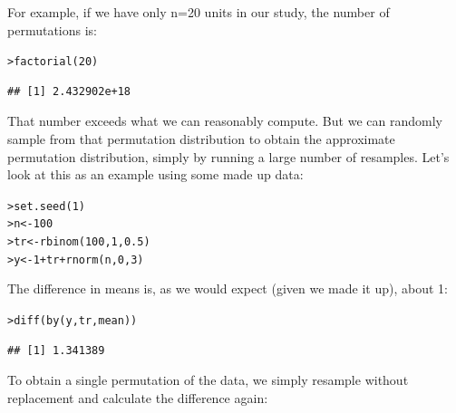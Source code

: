 \documentclass[12pt]{article}\usepackage[]{graphicx}\usepackage[]{color}
\makeatletter
\newcommand{\hlnum}[1]{\textcolor[rgb]{0.82,0.78,0.62}{#1}}%
\newcommand{\hlopt}[1]{\textcolor[rgb]{0.882,0.878,0.898}{#1}}%
\newcommand{\hlstd}[1]{\textcolor[rgb]{0.882,0.878,0.898}{#1}}%
\newcommand{\hlkwb}[1]{\textcolor[rgb]{0.902,0.675,0.196}{#1}}%
\newcommand{\hlkwd}[1]{\textcolor[rgb]{0.733,0.388,0.812}{#1}}%
\newenvironment{kframe}{%
 \def\at@end@of@kframe{}%
 \ifinner\ifhmode%
  \def\at@end@of@kframe{\end{minipage}}%
  \begin{minipage}{\columnwidth}%
 \fi\fi%
 \def\FrameCommand##1{\hskip\@totalleftmargin \hskip-\fboxsep
 \colorbox{shadecolor}{##1}\hskip-\fboxsep
     \hskip-\linewidth \hskip-\@totalleftmargin \hskip\columnwidth}%
 \MakeFramed {\advance\hsize-\width
   \@totalleftmargin\z@ \linewidth\hsize
   \@setminipage}}%
 {\par\unskip\endMakeFramed%
 \at@end@of@kframe}
\newenvironment{knitrout}{}{} %
\makeatother
\begin{document}
\begin{flushleft}
For example, if we have only n=20 units in our study, the number of permutations is:

\begin{knitrout}
\color{fgcolor}\begin{kframe}
\begin{alltt}
\hlstd{> }\hlkwd{factorial}\hlstd{(}\hlnum{20}\hlstd{)}
\end{alltt}
\begin{verbatim}
## [1] 2.432902e+18
\end{verbatim}
\end{kframe}
\end{knitrout}

That number exceeds what we can reasonably compute. But we can randomly sample from that permutation distribution to obtain the approximate permutation distribution, simply by running a large number of resamples. Let's look at this as an example using some made up data:

\begin{knitrout}
\color{fgcolor}\begin{kframe}
\begin{alltt}
\hlstd{> }\hlkwd{set.seed}\hlstd{(}\hlnum{1}\hlstd{)}
\hlstd{> }\hlstd{n} \hlkwb{<-} \hlnum{100}
\hlstd{> }\hlstd{tr} \hlkwb{<-} \hlkwd{rbinom}\hlstd{(}\hlnum{100}\hlstd{,} \hlnum{1}\hlstd{,} \hlnum{0.5}\hlstd{)}
\hlstd{> }\hlstd{y} \hlkwb{<-} \hlnum{1} \hlopt{+} \hlstd{tr} \hlopt{+} \hlkwd{rnorm}\hlstd{(n,} \hlnum{0}\hlstd{,} \hlnum{3}\hlstd{)}
\end{alltt}
\end{kframe}
\end{knitrout}

The difference in means is, as we would expect (given we made it up), about 1:

\begin{knitrout}
\color{fgcolor}\begin{kframe}
\begin{alltt}
\hlstd{> }\hlkwd{diff}\hlstd{(}\hlkwd{by}\hlstd{(y, tr, mean))}
\end{alltt}
\begin{verbatim}
## [1] 1.341389
\end{verbatim}
\end{kframe}
\end{knitrout}

To obtain a single permutation of the data, we simply resample without replacement and calculate the difference again:


\end{flushleft}
\end{document}
